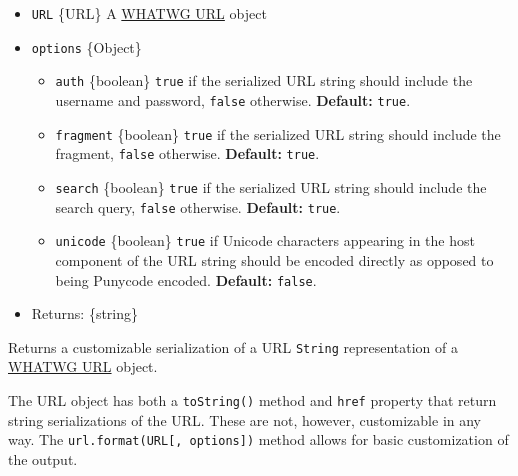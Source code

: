 \begin{itemize}
\tightlist
\item
  \texttt{URL} \{URL\} A \hyperref[the-whatwg-url-api]{WHATWG URL}
  object
\item
  \texttt{options} \{Object\}

  \begin{itemize}
  \tightlist
  \item
    \texttt{auth} \{boolean\} \texttt{true} if the serialized URL string
    should include the username and password, \texttt{false} otherwise.
    \textbf{Default:} \texttt{true}.
  \item
    \texttt{fragment} \{boolean\} \texttt{true} if the serialized URL
    string should include the fragment, \texttt{false} otherwise.
    \textbf{Default:} \texttt{true}.
  \item
    \texttt{search} \{boolean\} \texttt{true} if the serialized URL
    string should include the search query, \texttt{false} otherwise.
    \textbf{Default:} \texttt{true}.
  \item
    \texttt{unicode} \{boolean\} \texttt{true} if Unicode characters
    appearing in the host component of the URL string should be encoded
    directly as opposed to being Punycode encoded. \textbf{Default:}
    \texttt{false}.
  \end{itemize}
\item
  Returns: \{string\}
\end{itemize}

Returns a customizable serialization of a URL \texttt{String}
representation of a \hyperref[the-whatwg-url-api]{WHATWG URL} object.

The URL object has both a \texttt{toString()} method and \texttt{href}
property that return string serializations of the URL. These are not,
however, customizable in any way. The
\texttt{url.format(URL{[},\ options{]})} method allows for basic
customization of the output.

